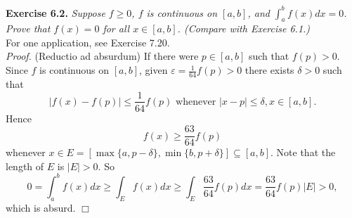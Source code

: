 \documentclass{article}
\begin{document}



\textbf{Exercise 6.2.}
\emph{Suppose $f \geq 0$,
$f$ is continuous on $[a,b]$, and $\int_{a}^{b} f(x) dx = 0$.
Prove that $f(x) = 0$ for all $x \in [a,b]$.
(Compare with Exercise 6.1.)} \\

For one application, see Exercise 7.20. \\

\emph{Proof.}
(Reductio ad absurdum)
If there were $p \in [a,b]$ such that $f(p) > 0$.
Since $f$ is continuous on $[a,b]$, given $\varepsilon = \frac{1}{64}f(p) > 0$
there exists $\delta > 0$
such that
\[
  |f(x) - f(p)| \leq \frac{1}{64}f(p) \text{ whenever } |x-p| \leq \delta, x \in [a,b].
\]
Hence
\[
  f(x) \geq \frac{63}{64}f(p)
\]
whenever $x \in E = [\max\{a,p-\delta\}, \min\{b,p+\delta\}] \subseteq [a,b]$.
Note that the length of $E$ is $|E| > 0$.
So
\[
  0
  = \int_{a}^{b} f(x) dx
  \geq \int_{E} f(x) dx
  \geq \int_{E} \frac{63}{64}f(p) dx
  = \frac{63}{64}f(p)|E| > 0,
\]
which is absurd.
$\Box$ \\\\



\end{document}
